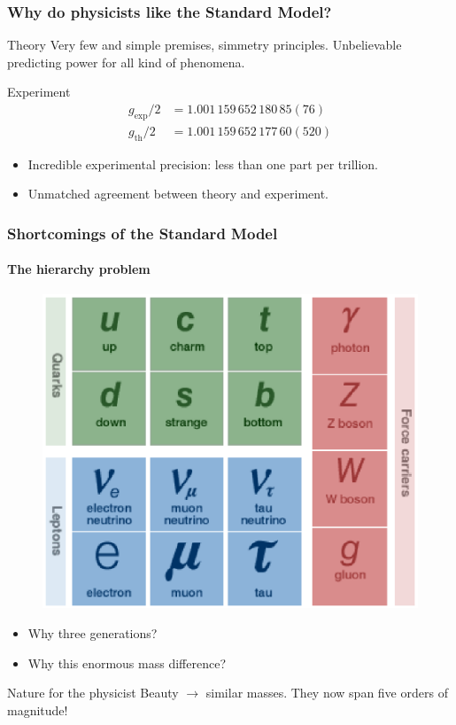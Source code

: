 \documentclass[ukenglish]{beamer}
\begin{document}
\begin{frame}
    \frametitle{Why do physicists like the Standard Model?}
    \begin{block}
        {Theory}
        Very few and simple premises, simmetry principles. Unbelievable
        predicting power for all kind of phenomena.
    \end{block}
    \begin{block}
        {Experiment}
        \begin{align*}
    g_{\text{exp}}/2 &= 1.001\,159\,652\,180\,85(76)\\
    g_{\text{th}}/2 &= 1.001\,159\,652\,177\,60(520)
        \end{align*}
        \begin{itemize}
            \item Incredible experimental precision: less than one part per
                trillion.
            \item Unmatched agreement between theory and experiment.
        \end{itemize}
    \end{block}
\end{frame}

\begin{frame}
    \frametitle{Shortcomings of the Standard Model}
    \framesubtitle{The hierarchy problem}
    \begin{figure}[h!]
        \centering
        \includegraphics[width=.35\textwidth]{standard_model_particles}
    \end{figure}
    \begin{itemize}
        \item Why three generations?
        \item Why this enormous mass difference?
    \end{itemize}
    \begin{block}
        {Nature for the physicist}
        Beauty $\rightarrow$ similar masses. They now span five orders of magnitude!
    \end{block}
\end{frame}
\end{document}
